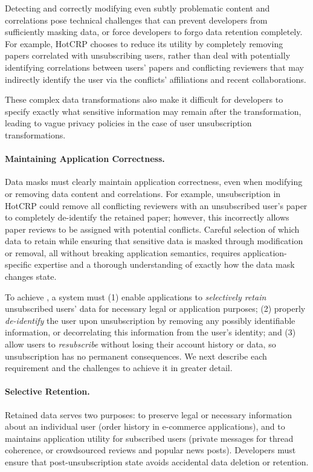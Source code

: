 Detecting and correctly modifying even subtly problematic content and correlations pose technical
challenges that can prevent developers from sufficiently masking data, or force developers
to forgo data retention completely. For example, HotCRP chooses to reduce its utility by completely
removing papers correlated with unsubscribing users, rather than deal with potentially identifying
correlations between users' papers and conflicting reviewers that may indirectly identify the user
via the conflicts' affiliations and recent collaborations. 

These complex data transformations also make it difficult for developers to specify exactly what
sensitive information may remain after the transformation, leading to \eg vague privacy policies in
the case of user unsubscription transformations.

\paragraph{Maintaining Application Correctness.}
Data masks must clearly maintain application correctness, even when modifying or removing data
content and correlations. For example, unsubscription in HotCRP could remove all
conflicting reviewers with an unsubscribed user's paper to completely de-identify the retained
paper; however, this incorrectly allows paper reviews to be assigned with potential conflicts.
Careful selection of which data to retain while ensuring that sensitive data is masked through
modification or removal, all without breaking application semantics, requires application-specific
expertise and a thorough understanding of exactly how the data mask changes state.

\iffalse
To achieve \name, a system must (1) enable applications to \emph{selectively retain} unsubscribed
users' data for necessary legal or application purposes; (2) properly \emph{de-identify} the user
upon unsubscription by removing any possibly identifiable information, or decorrelating this
information from the user's identity; and (3) allow users to \emph{resubscribe} without losing their
account history or data, so unsubscription has no permanent consequences. We next describe each
requirement and the challenges to achieve it in greater detail.

\paragraph{Selective Retention.}
Retained data serves two purposes: to preserve legal or
necessary information about an individual user (\eg order history in e-commerce applications), and
to maintains application utility for subscribed users (\eg private messages
for thread coherence, or crowdsourced reviews and popular news posts).
Developers must ensure that post-unsubscription state avoids accidental data deletion or retention.

